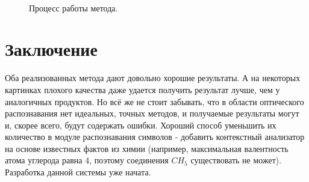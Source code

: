 \begin{figure}[H]
\centering
{} \\
\caption{Процесс работы метода.}
\end{figure}

\section{Заключение}
Оба реализованных метода дают довольно хорошие результаты. А на некоторых картинках плохого качества
даже удается получить результат лучше, чем у аналогичных продуктов. Но всё же не стоит забывать, что в области 
оптического распознавания нет идеальных, точных методов, и получаемые результаты могут и, скорее всего, будут содержать ошибки. 
Хороший способ уменьшить их количество в модуле распознавания символов - добавить контекстный анализатор на основе известных 
фактов из химии (например, максимальная валентность атома углерода равна 4, поэтому соединения $CH_5$ существовать не может).
Разработка данной системы уже начата.

